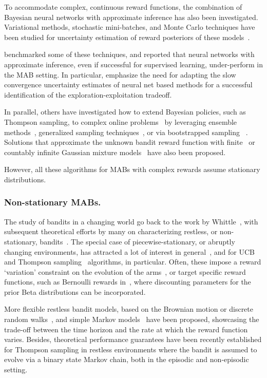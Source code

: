 To accommodate complex, continuous reward functions, 
the combination of Bayesian neural networks with approximate inference has also been investigated.
Variational methods, stochastic mini-batches, and Monte Carlo techniques have been studied for uncertainty estimation of reward posteriors of these models~\citep{ip-Blundell2015, ic-Kingma2015, ic-Osband2016, ip-Li2016}.

\citet{ip-Riquelme2018} benchmarked some of these techniques, and reported that neural networks with approximate inference, even if successful for supervised learning, under-perform in the MAB setting.
In particular, \citet{ip-Riquelme2018} emphasize
the need for adapting the slow convergence uncertainty estimates of neural net based methods
for a successful identification of the exploration-exploitation tradeoff.

In parallel,
others have investigated how to extend Bayesian policies, such as Thompson sampling, 
to complex online problems~\citep{ip-Gopalan2014}
by leveraging ensemble methods~\citep{ip-Lu2017},
generalized sampling techniques~\citep{j-Li2013},
or via bootstrapped sampling ~\citep{j-Eckles2019,j-Osband2015}.
Solutions that approximate
the unknown bandit reward function with finite~\citep{ip-Urteaga2018}
or countably infinite Gaussian mixture models~\citep{j-Urteaga2018a} have also been proposed.

However, all these algorithms for MABs with complex rewards assume stationary distributions.

\subsubsection{Non-stationary MABs.}
\label{sssec:mab_algos_dynamic}
The study of bandits in a changing world go back to the work by Whittle~\citep{j-Whittle1988},
with subsequent theoretical efforts by many on characterizing restless, or non-stationary, bandits~\citep{j-Auer2002a, j-Bubeck2012}.
The special case of piecewise-stationary, or abruptly changing environments, has attracted a lot of interest in general~\citep{ip-Yu2009,ip-Luo2018},
and for UCB~\citep{ip-Garivier2011} and Thompson sampling~\citep{ip-Mellor2013} algorithms, in particular.
Often, these impose a reward `variation' constraint on the evolution of the arms~\citep{j-Raj2017},
or target specific reward functions, such as Bernoulli rewards in~\citep{ic-Besbes2014},
where discounting parameters for the prior Beta distributions can be incorporated.

More flexible restless bandit models,
based on the Brownian motion or discrete random walks~\citep{ip-Slivkins2008},
and simple Markov models~\citep{ip-Bogunovic2016} have been proposed,
showcasing the trade-off between the time horizon and the rate at which the reward function varies.
Besides, theoretical performance guarantees have been recently established for Thompson sampling in restless environments
where the bandit is assumed to evolve via a binary state Markov chain,
both in the episodic \citep{ip-Jung2019} and non-episodic~\citep{j-Jung2019} setting.

